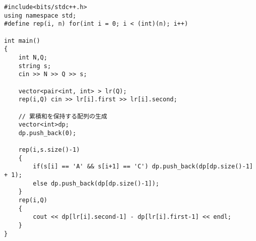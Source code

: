 \documentclass[11pt,a4paper]{jsarticle}
\begin{document}
\begin{lstlisting}[caption=累積和の実装例(ABC122 C問題),label=fuga]
#include<bits/stdc++.h>
using namespace std;
#define rep(i, n) for(int i = 0; i < (int)(n); i++)

int main()
{
    int N,Q;
    string s;
    cin >> N >> Q >> s;
 
    vector<pair<int, int> > lr(Q);
    rep(i,Q) cin >> lr[i].first >> lr[i].second;

    // 累積和を保持する配列の生成
    vector<int>dp;
    dp.push_back(0);
 
    rep(i,s.size()-1)
    {
        if(s[i] == 'A' && s[i+1] == 'C') dp.push_back(dp[dp.size()-1] + 1);
        else dp.push_back(dp[dp.size()-1]);
    }
    rep(i,Q)
    {
        cout << dp[lr[i].second-1] - dp[lr[i].first-1] << endl;
    }
}
\end{lstlisting}
\end{document}
